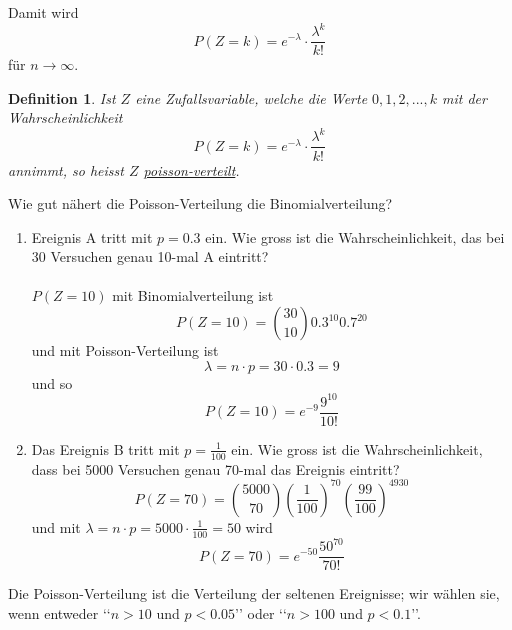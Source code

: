 \documentclass{report}
\newtheorem{mydef}{Definition}
\begin{document}
Damit wird
\begin{equation}
P(Z=k) = e^{-\lambda} \cdot \frac{\lambda^k}{k!}
\end{equation}
für $n \to \infty$.
\begin{mydef}
Ist $Z$ eine Zufallsvariable, welche die Werte $0, 1, 2, ..., k$ mit der Wahrscheinlichkeit
\begin{equation}
P(Z=k) = e^{-\lambda} \cdot \frac{\lambda^k}{k!}
\end{equation}
annimmt, so heisst $Z$ \underline{poisson-verteilt}.
\end{mydef}
Wie gut nähert die Poisson-Verteilung die Binomialverteilung?
\begin{enumerate}
\item
Ereignis A tritt mit $p = 0.3$ ein. Wie gross ist die Wahrscheinlichkeit, das bei 30 Versuchen genau 10-mal A eintritt?\\\\
$P(Z=10)$ mit Binomialverteilung ist
\begin{equation}
P(Z=10) = \binom{30}{10} 0.3^{10} 0.7^{20}
\end{equation}
und mit Poisson-Verteilung ist
\begin{equation}
\lambda = n \cdot p = 30 \cdot 0.3 =9
\end{equation}
und so
\begin{equation}
P(Z=10) = e^{-9} \frac{9^{10}}{10!}
\end{equation}
\item
Das Ereignis B tritt mit $p = \frac{1}{100}$ ein. Wie gross ist die Wahrscheinlichkeit, dass bei 5000 Versuchen genau 70-mal das Ereignis eintritt?
\begin{equation}
P(Z=70) = \binom{5000}{70} \left(\frac{1}{100}\right)^{70} \left(\frac{99}{100}\right)^{4930}
\end{equation}
und mit $\lambda = n \cdot p = 5000 \cdot \frac{1}{100} = 50$ wird
\begin{equation}
P(Z=70) = e^{-50} \frac{50^{70}}{70!}
\end{equation}
\end{enumerate}
Die Poisson-Verteilung ist die Verteilung der seltenen Ereignisse; wir wählen sie, wenn entweder \lq\lq{}$n > 10$ und $p < 0.05$\rq\rq{} oder \lq\lq{}$n > 100$ und $p < 0.1$\rq\rq{}.
\end{document}
